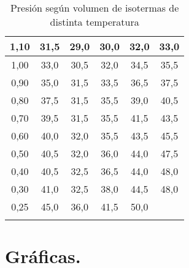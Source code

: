 \documentclass[a4paper,12pt,spanish]{article}
\begin{document}
\begin{longtable}[c]{c|ccccc|}
			\multicolumn{1}{|c|}{1,10} & \multicolumn{1}{c|}{31,5}   & \multicolumn{1}{c|}{29,0} & \multicolumn{1}{c|}{30,0} & \multicolumn{1}{c|}{32,0} & 33,0 \\ \hline
			\multicolumn{1}{|c|}{1,00} & \multicolumn{1}{c|}{33,0}   & \multicolumn{1}{c|}{30,5} & \multicolumn{1}{c|}{32,0} & \multicolumn{1}{c|}{34,5} & 35,5 \\ \hline
			\multicolumn{1}{|c|}{0,90} & \multicolumn{1}{c|}{35,0}   & \multicolumn{1}{c|}{31,5} & \multicolumn{1}{c|}{33,5} & \multicolumn{1}{c|}{36,5} & 37,5 \\ \hline
			\multicolumn{1}{|c|}{0,80} & \multicolumn{1}{c|}{37,5}   & \multicolumn{1}{c|}{31,5} & \multicolumn{1}{c|}{35,5} & \multicolumn{1}{c|}{39,0} & 40,5 \\ \hline
			\multicolumn{1}{|c|}{0,70} & \multicolumn{1}{c|}{39,5}   & \multicolumn{1}{c|}{31,5} & \multicolumn{1}{c|}{35,5} & \multicolumn{1}{c|}{41,5} & 43,5 \\ \hline
			\multicolumn{1}{|c|}{0,60} & \multicolumn{1}{c|}{40,0}   & \multicolumn{1}{c|}{32,0} & \multicolumn{1}{c|}{35,5} & \multicolumn{1}{c|}{43,5} & 45,5 \\ \hline
			\multicolumn{1}{|c|}{0,50} & \multicolumn{1}{c|}{40,5}   & \multicolumn{1}{c|}{32,0} & \multicolumn{1}{c|}{36,0} & \multicolumn{1}{c|}{44,0} & 47,5 \\ \hline
			\multicolumn{1}{|c|}{0,40} & \multicolumn{1}{c|}{40,5}   & \multicolumn{1}{c|}{32,5} & \multicolumn{1}{c|}{36,5} & \multicolumn{1}{c|}{44,0} & 48,0 \\ \hline
			\multicolumn{1}{|c|}{0,30} & \multicolumn{1}{c|}{41,0}   & \multicolumn{1}{c|}{32,5} & \multicolumn{1}{c|}{38,0} & \multicolumn{1}{c|}{44,5} & 48,0 \\ \hline
			\multicolumn{1}{|c|}{0,25} & \multicolumn{1}{c|}{45,0}   & \multicolumn{1}{c|}{36,0} & \multicolumn{1}{c|}{41,5} & \multicolumn{1}{c|}{50,0} &      \\ \hline
		\caption{Presión según volumen de isotermas de distinta temperatura}
		\label{tab:tab1}
	\end{longtable}



	\section{Gráficas.}
	
\end{document}
